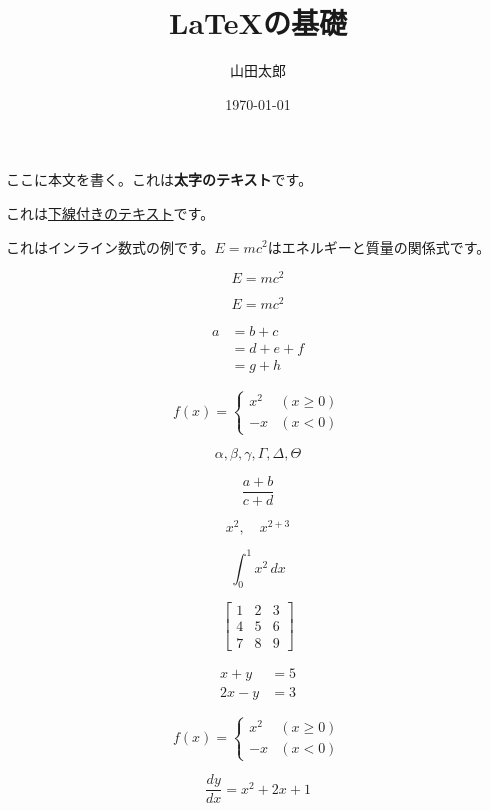 \documentclass{article}
\title{LaTeXの基礎}
\author{山田太郎}
\date{\today}
\begin{document}
\maketitle

ここに本文を書く。これは\textbf{太字のテキスト}です。

これは\underline{下線付きのテキスト}です。

これはインライン数式の例です。$E=mc^2$はエネルギーと質量の関係式です。

\[
  E=mc^2
\]

\begin{equation}
  E=mc^2
\end{equation}

\begin{align}
  a & =b+c   \\
    & =d+e+f \\
    & =g+h
\end{align}

\begin{equation}
  f(x) =
  \begin{cases}
    x^2 & (x \geq 0) \\
    -x  & (x < 0)
  \end{cases}
\end{equation}

\[
  \alpha, \beta, \gamma, \Gamma, \Delta, \Theta
\]

\[
  \frac{a+b}{c+d}
\]

\[
  x^2,\quad x^{2+3}
\]

\[
  \int_{0}^{1}x^2\,dx
\]

\[
  \begin{bmatrix}
    1 & 2 & 3 \\
    4 & 5 & 6 \\
    7 & 8 & 9
  \end{bmatrix}
\]

\begin{align}
  x+y  & =5 \\
  2x-y & =3
\end{align}

\[
  f(x)=
  \begin{cases}
    x^2 & (x\geq 0) \\
    -x  & (x<0)
  \end{cases}
\]

\[
  \frac{dy}{dx}=x^2+2x+1
\]
\end{document}
